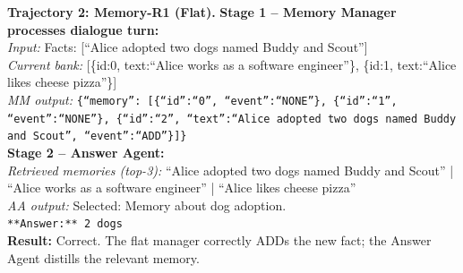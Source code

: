 \documentclass{article}
\theoremstyle{definition}
\begin{document}
\begin{tcolorbox}[aclbox, width=\linewidth]
\small
\textbf{Trajectory 2: Memory-R1 (Flat).}
\textbf{Stage 1 -- Memory Manager processes dialogue turn:}\\
\textit{Input:} Facts: [``Alice adopted two dogs named Buddy and Scout'']\\
\textit{Current bank:} [\{id:0, text:``Alice works as a software engineer''\}, \{id:1, text:``Alice likes cheese pizza''\}]\\
\textit{MM output:} \texttt{\{``memory'': [\{``id'':``0'', ``event'':``NONE''\}, \{``id'':``1'', ``event'':``NONE''\}, \{``id'':``2'', ``text'':``Alice adopted two dogs named Buddy and Scout'', ``event'':``ADD''\}]\}}\\[4pt]
\textbf{Stage 2 -- Answer Agent:}\\
\textit{Retrieved memories (top-3):} ``Alice adopted two dogs named Buddy and Scout'' | ``Alice works as a software engineer'' | ``Alice likes cheese pizza''\\
\textit{AA output:} Selected: Memory about dog adoption.\\
\texttt{**Answer:** 2 dogs}\\[2pt]
\textbf{Result:} \textcolor{green!50!black}{Correct}. The flat manager correctly ADDs the new fact; the Answer Agent distills the relevant memory.
\end{tcolorbox}
\end{document}
